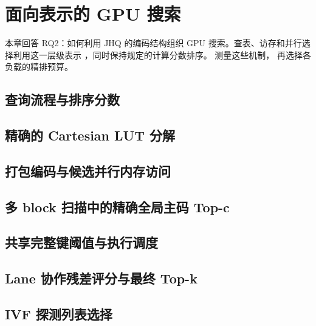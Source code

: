 \chapter{面向表示的 GPU 搜索}
\label{ch:gpu-execution}
本章回答 RQ2：如何利用 JHQ 的编码结构组织 GPU 搜索。查表、访存和并行选择利用这一层级表示 \cite{jhq}，同时保持规定的计算分数排序。 测量这些机制， 再选择各负载的精排预算。

\section{查询流程与排序分数}
\label{sec:5-1}


\section{精确的 Cartesian LUT 分解}
\label{sec:5-2}


\section{打包编码与候选并行内存访问}
\label{sec:5-3}


\section{多 block 扫描中的精确全局主码 Top-c}
\label{sec:5-4}


\section{共享完整键阈值与执行调度}
\label{sec:5-5}


\section{Lane 协作残差评分与最终 Top-k}
\label{sec:5-6}


\section{IVF 探测列表选择}
\label{sec:5-7}

